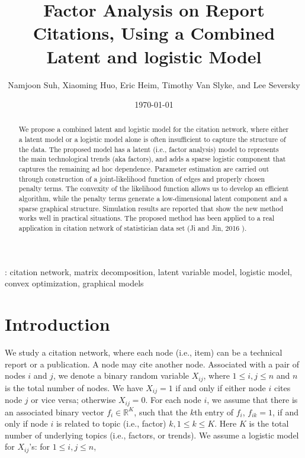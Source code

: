 \documentclass{article}
\begin{document}
\title{Factor Analysis on Report Citations, Using a Combined Latent and logistic Model}
\author{Namjoon Suh, Xiaoming Huo, Eric Heim, Timothy Van Slyke, and Lee Seversky}

\date{\today}
\maketitle

\begin{abstract}
We propose a combined latent and logistic model for the citation network, where either a latent model or a logistic model alone is often insufficient to capture the structure of the data.
    The proposed model has a latent (i.e., factor analysis) model to represents the main technological trends (aka factors), and adds a sparse logistic component that captures the remaining ad hoc dependence. Parameter estimation are carried out through construction of a joint-likelihood function of edges and properly chosen penalty terms. The convexity of the likelihood function allows us to develop an efficient algorithm, while the penalty terms generate a low-dimensional latent component and a sparse graphical structure. Simulation results are reported that show the new method works well in practical situations. The proposed method has been applied to a real application in citation network of statistician data set (Ji and Jin, 2016 \cite{ji2016coauthorship}).
\end{abstract}

: citation network, matrix decomposition, latent variable model,  logistic model, convex optimization, graphical models 

\section{Introduction}\label{sec:intro}
We study a citation network, where each node (i.e., item) can be a technical report or a publication. A node may cite another node. Associated with a pair of nodes $i$ and $j$, we denote a binary random variable $X_{ij}$, where $1 \le i,j \le n$ and $n$ is the total number of nodes. We have $X_{ij}=1$ if and only if either node $i$ cites node $j$ or vice versa; otherwise $X_{ij}=0$. For each node $i$, we assume that there is an associated binary vector $f_{i} \in \mathbb{R}^K$, such that the $k$th entry of $f_{i}$, $f_{ik} = 1$, if and only if node $i$ is related to topic (i.e., factor) $k, 1\le k \le K$. Here $K$ is the total number of underlying topics (i.e., factors, or trends). We assume a logistic model for $X_{ij}$'s: for $1\le i,j \le n$,
\end{document}
